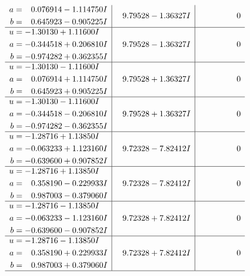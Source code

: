 \documentclass[1p]{elsarticle_modified}
\theoremstyle{definition}
\begin{document}
$$\begin{array}{c|c|c}
\begin{aligned}
a &= \phantom{-}0.076914 - 1.114750 I \\
b &= \phantom{-}0.645923 - 0.905225 I\end{aligned}
 & \phantom{-}9.79528 - 1.36327 I & \phantom{-0.000000 } 0 \\ \hline\begin{aligned}
u &= -1.30130 + 1.11600 I \\
a &= -0.344518 + 0.206810 I \\
b &= -0.974282 + 0.362355 I\end{aligned}
 & \phantom{-}9.79528 - 1.36327 I & \phantom{-0.000000 } 0 \\ \hline\begin{aligned}
u &= -1.30130 - 1.11600 I \\
a &= \phantom{-}0.076914 + 1.114750 I \\
b &= \phantom{-}0.645923 + 0.905225 I\end{aligned}
 & \phantom{-}9.79528 + 1.36327 I & \phantom{-0.000000 } 0 \\ \hline\begin{aligned}
u &= -1.30130 - 1.11600 I \\
a &= -0.344518 - 0.206810 I \\
b &= -0.974282 - 0.362355 I\end{aligned}
 & \phantom{-}9.79528 + 1.36327 I & \phantom{-0.000000 } 0 \\ \hline\begin{aligned}
u &= -1.28716 + 1.13850 I \\
a &= -0.063233 + 1.123160 I \\
b &= -0.639600 + 0.907852 I\end{aligned}
 & \phantom{-}9.72328 - 7.82412 I & \phantom{-0.000000 } 0 \\ \hline\begin{aligned}
u &= -1.28716 + 1.13850 I \\
a &= \phantom{-}0.358190 - 0.229933 I \\
b &= \phantom{-}0.987003 - 0.379060 I\end{aligned}
 & \phantom{-}9.72328 - 7.82412 I & \phantom{-0.000000 } 0 \\ \hline\begin{aligned}
u &= -1.28716 - 1.13850 I \\
a &= -0.063233 - 1.123160 I \\
b &= -0.639600 - 0.907852 I\end{aligned}
 & \phantom{-}9.72328 + 7.82412 I & \phantom{-0.000000 } 0 \\ \hline\begin{aligned}
u &= -1.28716 - 1.13850 I \\
a &= \phantom{-}0.358190 + 0.229933 I \\
b &= \phantom{-}0.987003 + 0.379060 I\end{aligned}
 & \phantom{-}9.72328 + 7.82412 I & \phantom{-0.000000 } 0\\
 \hline 
 \end{array}$$\newpage\newpage\renewcommand{\arraystretch}{1}
\end{document}
